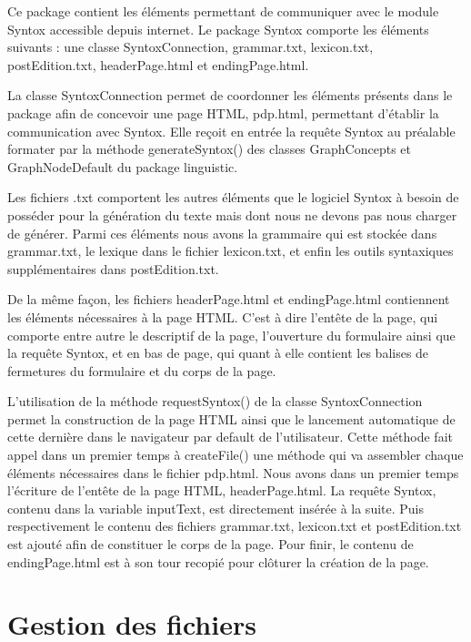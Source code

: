 \documentclass[12pt]{report}
\begin{document}
Ce package contient les éléments permettant de communiquer avec le module Syntox accessible depuis internet. Le package Syntox comporte les éléments suivants : une classe SyntoxConnection, grammar.txt, lexicon.txt, postEdition.txt, headerPage.html et endingPage.html.

\bigskip
La classe SyntoxConnection permet de coordonner les éléments présents dans le package afin de concevoir une page HTML, pdp.html, permettant d'établir la communication avec Syntox. Elle reçoit en entrée la requête Syntox au préalable formater par la méthode generateSyntox() des classes GraphConcepts et GraphNodeDefault du package linguistic. 

\bikskip
Les fichiers .txt comportent les autres éléments que le logiciel Syntox à besoin de posséder pour la génération du texte mais dont nous ne devons pas nous charger de générer. Parmi ces éléments nous avons la grammaire qui est stockée dans grammar.txt, le lexique dans le fichier lexicon.txt, et enfin les outils syntaxiques supplémentaires dans postEdition.txt. 

\bigskip
De la même façon, les fichiers headerPage.html et endingPage.html contiennent les éléments nécessaires à la page HTML. C'est à dire l'entête de la page, qui comporte entre autre le descriptif de la page, l'ouverture du formulaire ainsi que la requête Syntox, et en bas de page, qui quant à elle contient les balises de fermetures du formulaire et du corps de la page. 

\bigskip
L'utilisation de la méthode requestSyntox() de la classe SyntoxConnection permet la construction de la page HTML ainsi que le lancement automatique de cette dernière dans le navigateur par default de l'utilisateur. Cette méthode fait appel dans un premier temps à createFile() une méthode qui va assembler chaque éléments nécessaires dans le fichier pdp.html. Nous avons dans un premier temps l'écriture de l'entête de la page HTML, headerPage.html. La requête Syntox, contenu dans la variable inputText, est directement insérée à la suite. Puis respectivement le contenu des fichiers grammar.txt, lexicon.txt et postEdition.txt est ajouté afin de constituer le corps de la page. Pour finir, le contenu de endingPage.html est à son tour recopié pour clôturer la création de la page. 

   


\section{Gestion des fichiers}
\end{document}
